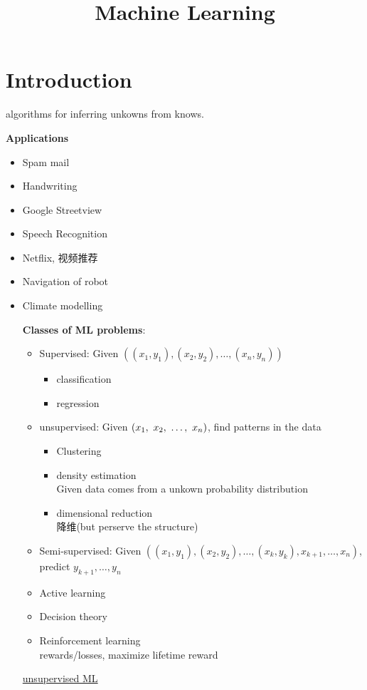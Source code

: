 \documentclass{article}
\begin{document}
\title{Machine Learning}
\author{}
\maketitle
\tableofcontents
\newpage
\section{Introduction}
algorithms for inferring unkowns from knows.

\textbf{Applications}
\begin{itemize}
\item Spam mail
\item Handwriting
\item Google Streetview
\item Speech Recognition
\item Netflix, 视频推荐
\item Navigation of robot
\item Climate modelling
\begin{itemize}

\textbf{Classes of ML problems}:
\begin{itemize}
\item Supervised: Given $((x_1, y_1), (x_2, y_2), \ldots, (x_n, y_n))$
	\begin{itemize}
	\item classification
	\item regression
	\end{itemize}
\item unsupervised: Given $(x_1,~x_2,~\ldots,~x_n)$, find patterns in the data
	\begin{itemize}
	\item Clustering
	\item density estimation\\
		Given data comes from a unkown probability distribution
	\item dimensional reduction\\
		降维(but perserve the structure)
	\end{itemize}
\item Semi-supervised: Given $((x_1, y_1), (x_2, y_2), \ldots, (x_k, y_k), x_{k+1}, \ldots, x_n)$, predict $y_{k+1}, \ldots, y_n$
\item Active learning
\item Decision theory
\item Reinforcement learning\\
	rewards/losses, maximize lifetime reward
\end{itemize}
\href{http://i.imgbox.com/sVuBzaqV.png}{unsupervised ML}


\end{itemize}
\end{itemize}
\end{document}
